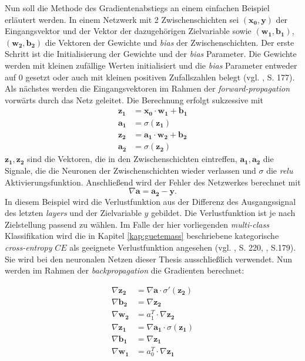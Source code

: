 \documentclass[a4paper,11pt]{article}
\begin{document}
Nun soll die Methode des Gradientenabstiegs an einem einfachen Beispiel erläutert werden. In einem Netzwerk mit 2 Zwischenschichten sei $(\bm{x_0}, \bm{y})$ der Eingangsvektor und der Vektor der dazugehörigen Zielvariable sowie $(\bm{w_1}, \bm{b_1})$, $(\bm{w_2}, \bm{b_2})$ die Vektoren der Gewichte und \textit{bias} der Zwischenschichten. Der erste Schritt ist die Initialisierung der Gewichte und der \textit{bias} Parameter. Die Gewichte werden mit kleinen zufällige Werten initialisiert und die \textit{bias} Parameter entweder auf $0$ gesetzt oder auch mit kleinen positiven Zufallszahlen belegt (vgl. \cite{deepL}, S. 177). Als nächstes werden die Eingangsvektoren im Rahmen der \textit{forward-propagation} vorwärts durch das Netz geleitet. Die Berechnung erfolgt sukzessive mit
\begin{align*}
    \bm{z_1} &= \bm{x_0} \cdot \bm{w_1} + \bm{b_1} \\
    \bm{a_1} &= \sigma(\bm{z_1}) \\
    \bm{z_2} &= \bm{a_1} \cdot \bm{w_2} + \bm{b_2} \\
    \bm{a_2} &= \sigma (\bm{z_2})
\end{align*}{}
$\bm{z_1}, \bm{z_2}$ sind die Vektoren, die in den Zwischenschichten eintreffen, $\bm{a_1}, \bm{a_2}$ die Signale, die die Neuronen der Zwischenschichten wieder verlassen und $\sigma$ die \textit{relu} Aktivierungsfunktion. Anschließend wird der Fehler des Netzwerkes berechnet mit 
\[\nabla \bm{a} = \bm{a_2} - \bm{y} .\]
In diesem Beispiel wird die Verlustfunktion aus der Differenz des Ausgangssignal des letzten \textit{layers} und der Zielvariable $y$ gebildet. Die Verlustfunktion ist je nach Zielstellung passend zu wählen. Im Falle der hier vorliegenden \textit{multi-class} Klassifikation wird die in Kapitel \ref{kap:guetemass} beschriebene kategorische \textit{cross-entropy} $CE$ als geeignete Verlustfunktion angesehen (vgl. \cite{deepEssentials}, S. 220, \cite{keras}, S.179). Sie wird bei den neuronalen Netzen dieser Thesis ausschließlich verwendet. 
Nun werden im Rahmen der \textit{backpropagation} die Gradienten berechnet:

\begin{align*}
    \nabla \bm{z_2} &= \nabla \bm{a} \cdot \sigma' (\bm{z_2}) \\
    \nabla \bm{b_2} &= \nabla \bm{z_2} \\
    \nabla \bm{w_2} &= a_1^T \cdot \nabla \bm{z_2} \\
    \nabla \bm{z_1} &= \nabla \bm{a_1} \cdot \sigma (\bm{z_1}) \\
    \nabla \bm{b_1} &= \nabla \bm{z_1} \\
    \nabla \bm{w_1} &= a_0^T \cdot \nabla \bm{z_1} 
\end{align*}{}
\end{document}
